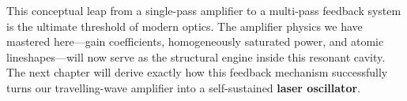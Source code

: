 This conceptual leap from a single-pass amplifier to a multi-pass feedback system is the ultimate threshold of modern optics. The amplifier physics we have mastered here—gain coefficients, homogeneously saturated power, and atomic lineshapes—will now serve as the structural engine inside this resonant cavity. The next chapter will derive exactly how this feedback mechanism successfully turns our travelling-wave amplifier into a self-sustained \textbf{laser oscillator}.
